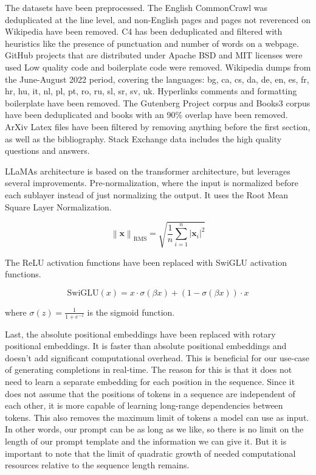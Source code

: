 The datasets have been preprocessed. The English CommonCrawl  was deduplicated at the line level, and non-English pages and pages not reverenced on Wikipedia have been removed. C4 has been deduplicated and filtered with heuristics like the presence of punctuation and number of words on a webpage. GitHub projects that are distributed under Apache BSD and MIT licenses were used Low quality code and boilerplate code were removed.
Wikipedia dumps from the June-August 2022 period, covering the languages: bg, ca, cs, da, de, en, es, fr, hr, hu, it, nl, pl, pt, ro, ru, sl, sr, sv, uk. Hyperlinks comments and formatting boilerplate have been removed. The Gutenberg Project corpus and Books3 corpus have been deduplicated and books with an 90\% overlap have been removed. 
ArXiv Latex files have been filtered by removing anything before the first section, as well as the bibliography. Stack Exchange data includes the high quality questions and answers. 




LLaMAs architecture is based on the transformer architecture, but leverages several improvements. Pre-normalization, where the input is normalized before each sublayer instead  of just normalizing the output. It uses the Root Mean Square Layer Normalization\cite{zhang2019root}.

\newcommand{\norm}[1]{\left\lVert#1\right\rVert}

\[
\norm{\mathbf{x}}_{\text{RMS}} = \sqrt{\frac{1}{n} \sum_{i=1}^n |\mathbf{x}_i|^2}
\]


The ReLU activation functions have been replaced with SwiGLU activation functions.


\begin{equation}
\text{SwiGLU}(x) = x \cdot \sigma(\beta x) + (1 - \sigma(\beta x)) \cdot x
\end{equation}

where \(\sigma(z) = \frac{1}{1 + e^{-z}}\) is the sigmoid function.

Last, the absolute positional embeddings have been replaced with rotary positional embeddings. It is faster than absolute positional embeddings and doesn't add significant computational overhead. This is beneficial for our use-case of generating completions in real-time. The reason for this is that it does not need to learn  a separate embedding for each position in the sequence. Since it does not assume that the positions of tokens in a sequence are independent of each other, it is more capable of learning long-range dependencies between tokens. This also removes the maximum limit of tokens a model can use as input. In other words, our prompt can be as long as we like, so there is no limit on the length of our prompt template and the information we can give it. But it is important to note that the limit of quadratic growth of needed computational resources 
relative to the sequence length remains.



